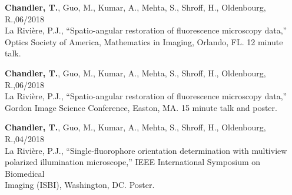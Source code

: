 \documentclass[12pt,letterpaper]{article}
\begin{document}
\begin{benumerate}{12}
\item {\textbf{Chandler, T.}, Guo, M., Kumar, A., Mehta, S., Shroff, H., Oldenbourg, R.,\hfill 06/2018\\ La Rivi\`ere, P.J., ``Spatio-angular restoration of fluorescence microscopy data,'' \\
      Optics Society of America, Mathematics in Imaging, Orlando, FL. 12 minute talk.}

\item {\textbf{Chandler, T.}, Guo, M., Kumar, A., Mehta, S., Shroff, H., Oldenbourg, R.,\hfill 06/2018\\ La Rivi\`ere, P.J., ``Spatio-angular restoration of fluorescence microscopy data,''\\
      Gordon Image Science Conference, Easton, MA. 15 minute talk and poster.}

\item {\textbf{Chandler, T.}, Guo, M., Kumar, A., Mehta, S., Shroff, H., Oldenbourg, R.,\hfill 04/2018\\ La Rivi\`ere, P.J., ``Single-fluorophore orientation determination with multiview\\ polarized
      illumination microscope,'' IEEE International Symposium on Biomedical\\ Imaging (ISBI), Washington, DC. Poster.}
\end{benumerate}
\end{document}
